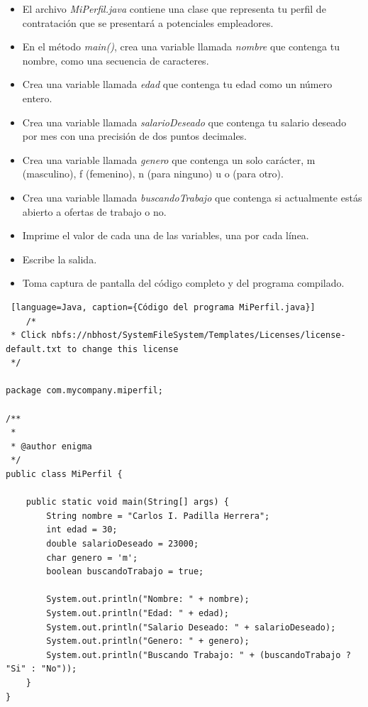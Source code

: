 \documentclass{article}
\begin{document}
\begin{itemize}
    \item El archivo \textit{MiPerfil.java} contiene una clase que representa tu perfil de contratación que se presentará a potenciales empleadores.
    \item En el método \textit{main()}, crea una variable llamada \textit{nombre} que contenga tu nombre, como una secuencia de caracteres.
    \item Crea una variable llamada \textit{edad} que contenga tu edad como un número entero.
    \item Crea una variable llamada \textit{salarioDeseado} que contenga tu salario deseado por mes con una precisión de dos puntos decimales.
    \item Crea una variable llamada \textit{genero} que contenga un solo carácter, m (masculino), f (femenino), n (para ninguno) u o (para otro).
    \item Crea una variable llamada \textit{buscandoTrabajo} que contenga si actualmente estás abierto a ofertas de trabajo o no.
    \item Imprime el valor de cada una de las variables, una por cada línea.
    \item Escribe la salida.
    \item Toma captura de pantalla del código completo y del programa compilado.
\end{itemize}

\begin{lstlisting} [language=Java, caption={Código del programa MiPerfil.java}]
    /*
 * Click nbfs://nbhost/SystemFileSystem/Templates/Licenses/license-default.txt to change this license
 */

package com.mycompany.miperfil;

/**
 *
 * @author enigma
 */
public class MiPerfil {

    public static void main(String[] args) {
        String nombre = "Carlos I. Padilla Herrera";
        int edad = 30;
        double salarioDeseado = 23000;
        char genero = 'm';
        boolean buscandoTrabajo = true;

        System.out.println("Nombre: " + nombre);
        System.out.println("Edad: " + edad);
        System.out.println("Salario Deseado: " + salarioDeseado);
        System.out.println("Genero: " + genero);
        System.out.println("Buscando Trabajo: " + (buscandoTrabajo ? "Si" : "No"));
    }
}

\end{lstlisting}
\end{document}
